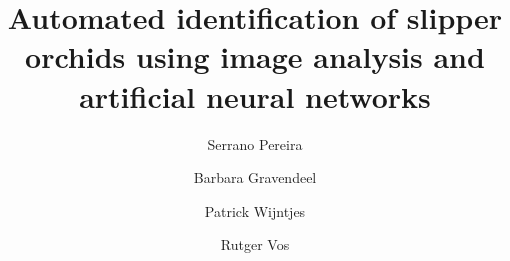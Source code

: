 \documentclass[3p,twocolumn,10pt]{elsarticle}
\begin{document}
\hypersetup{
    citecolor=DodgerBlue4,
    filecolor=black,
    linkcolor=black,
    urlcolor=DodgerBlue4
}

\begin{frontmatter}



\title{Automated identification of slipper orchids using image analysis and artificial neural networks}



\author[nbc]{Serrano Pereira}
\author[nbc,hsl,lu]{Barbara Gravendeel}
\author[hsl]{Patrick Wijntjes}
\author[nbc]{Rutger Vos}
\address[nbc]{Naturalis Biodiversity Center, Leiden, The Netherlands}
\address[hsl]{University of Applied Sciences Leiden, Leiden, The Netherlands}
\address[lu]{Institute Biology Leiden, Leiden University, Leiden, The Netherlands}



\end{frontmatter}
\end{document}

